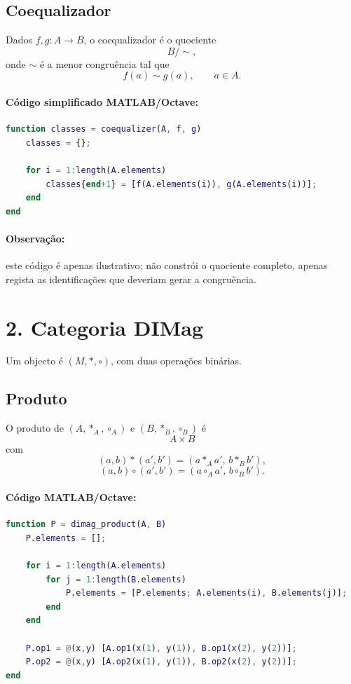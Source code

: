\documentclass[a4paper,12pt]{article}
\begin{document}
\subsection*{Coequalizador}

Dados $f,g:A\to B$, o coequalizador é o quociente
\[
B/{\sim},
\]
onde $\sim$ é a menor congruência tal que
\[
f(a)\sim g(a),\qquad a\in A.
\]

\paragraph{Código simplificado MATLAB/Octave:}
\begin{lstlisting}[language=Matlab]
function classes = coequalizer(A, f, g)
    classes = {};
    
    for i = 1:length(A.elements)
        classes{end+1} = [f(A.elements(i)), g(A.elements(i))];
    end
end
\end{lstlisting}

\paragraph{Observação:}
este código é apenas ilustrativo; não constrói o quociente completo, apenas
regista as identificações que deveriam gerar a congruência.

\section*{2. Categoria \(\mathbf{DIMag}\)}

Um objecto é $(M,\ast,\circ)$, com duas operações binárias.

\subsection*{Produto}

O produto de $(A,\ast_A,\circ_A)$ e $(B,\ast_B,\circ_B)$ é
\[
A\times B
\]
com
\[
(a,b)\ast(a',b')=(a\ast_A a',\, b\ast_B b'),
\]
\[
(a,b)\circ(a',b')=(a\circ_A a',\, b\circ_B b').
\]

\paragraph{Código MATLAB/Octave:}
\begin{lstlisting}[language=Matlab]
function P = dimag_product(A, B)
    P.elements = [];
    
    for i = 1:length(A.elements)
        for j = 1:length(B.elements)
            P.elements = [P.elements; A.elements(i), B.elements(j)];
        end
    end
    
    P.op1 = @(x,y) [A.op1(x(1), y(1)), B.op1(x(2), y(2))];
    P.op2 = @(x,y) [A.op2(x(1), y(1)), B.op2(x(2), y(2))];
end
\end{lstlisting}
\end{document}
